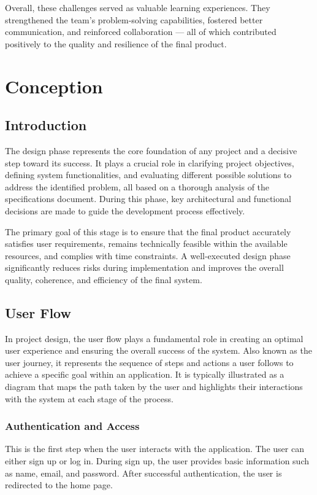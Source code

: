\documentclass[12pt]{article}
\begin{document}
Overall, these challenges served as valuable learning experiences. They strengthened the team's problem-solving capabilities, fostered better communication, and reinforced collaboration — all of which contributed positively to the quality and resilience of the final product.

\newpage

\section{Conception}
\subsection{Introduction}
The design phase represents the core foundation of any project and a decisive step toward its success. It plays a crucial role in clarifying project objectives, defining system functionalities, and evaluating different possible solutions to address the identified problem, all based on a thorough analysis of the specifications document. During this phase, key architectural and functional decisions are made to guide the development process effectively.

The primary goal of this stage is to ensure that the final product accurately satisfies user requirements, remains technically feasible within the available resources, and complies with time constraints. A well-executed design phase significantly reduces risks during implementation and improves the overall quality, coherence, and efficiency of the final system.
\subsection{User Flow}
In project design, the user flow plays a fundamental role in creating an optimal user experience and ensuring the overall success of the system. Also known as the user journey, it represents the sequence of steps and actions a user follows to achieve a specific goal within an application. It is typically illustrated as a diagram that maps the path taken by the user and highlights their interactions with the system at each stage of the process.
\subsubsection{Authentication and Access}
This is the first step when the user interacts with the application.
The user can either sign up or log in.
During sign up, the user provides basic information such as name, email, and password.
After successful authentication, the user is redirected to the home page.
\end{document}
